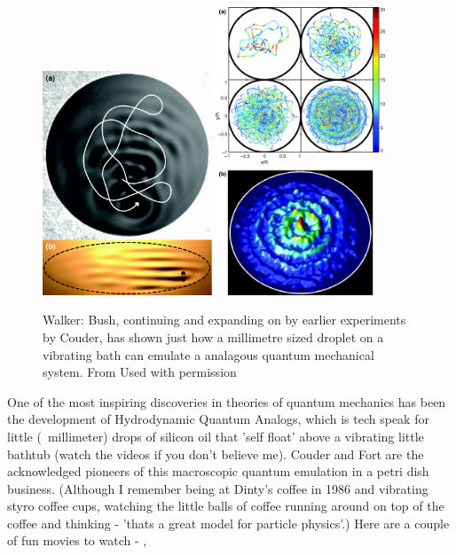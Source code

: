 \documentclass[../rzero]{subfiles}
\begin{document}
\begin{figure}\label{bushWalkerFigure}
\includegraphics[width=0.45\textwidth]{chapters/images/bush-drop-path.png}
\includegraphics[width=0.45\textwidth]{chapters/images/bush-corral.png}
\caption{Walker: Bush, continuing and expanding on by earlier experiments by Couder, has shown just how a millimetre sized droplet on a vibrating bath can emulate a analagous quantum mechanical system. From\cite{harrisWavelikeStatisticsPilotwave2013} Used with permission}
\end{figure}

One of the most inspiring discoveries in theories of quantum mechanics has been the development of Hydrodynamic Quantum Analogs, which is tech speak for little (~millimeter) drops of silicon oil that 'self float' above a vibrating little bathtub (watch the videos if you don't believe me). Couder and Fort \cite{eddiInformationStoredFaraday2011} are the acknowledged pioneers of this macroscopic quantum emulation in a petri dish business. (Although I remember being at Dinty's coffee in 1986 and vibrating styro coffee cups, watching the little balls of coffee running around on top of the coffee and thinking - 'thats a great model for particle physics'.) Here are a couple of fun movies to watch - \cite{americanphysicalsocietyFaradayInstabilityFloating2014}, \cite{veritasiumThisWhatQuantum2016} 
\end{document}
